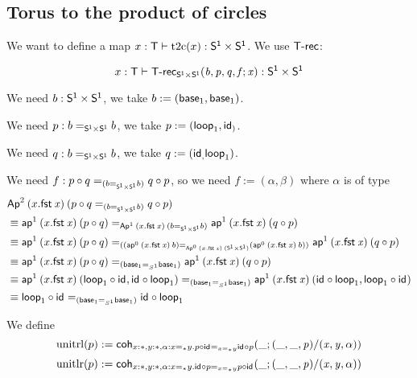 \subsection{Torus to the product of circles}

\newcommand{\ttoc}{\mathrm{t2c}}
\newcommand{\ctot}{\mathrm{c2t}}
\newcommand{\PP}{\dsd{S^1\times S^1}}
\newcommand{\unitlr}{\mathrm{unitlr}}
\newcommand{\unitrl}{\mathrm{unitrl}}

We want to define a map $x:\dsd{T}\vdash\ttoc(x):\PP$. We use
$\mathsf{T\text{-}rec}$:

\[\ofglob{x:\dsd{T}}{\dsd{T\text{-}rec}_{\PP}(b,p,q,f;x)}{\PP}\]

We need $b:\PP$, we take $b:=(\mathsf{base}_{1},\mathsf{base}_{1})$.

We need $p:\homj{\PP}{b}{b}$, we take $p:=(\mathsf{loop}_{1},\mathsf{id}_{)}$.

We need $q:\homj{\PP}{b}{b}$, we take $q:=(\mathsf{id}_{,}\mathsf{loop}_{1})$.

We need $f:\homj{(\homj{\PP}{b}{b})}{p\circ q}{q\circ p}$, so we need
$f:=(\alpha, \beta)$ where $\alpha$ is of type
\begin{align*}
  &\Apn{2}{(x.\fst x)}{(\homj{(\homj{\PP}{b}{b})}{p\circ q}{q\circ p})}\\
  &\equiv \homj{\Apn{1}{(x.\fst x)}(\homj{\PP}{b}{b})}
  {\apn{1}{(x.\fst x)}{(p\circ q)}}{\apn{1}{(x.\fst x)}{(q\circ p)}} \\
  &\equiv \homj{(\homj{\Apn{0}{(x.\fst x)}(\PP)}{(\apn{0}{(x.\fst x)}b)}
    {(\apn{0}{(x.\fst x)}b)})}
  {\apn{1}{(x.\fst x)}{(p\circ q)}}{\apn{1}{(x.\fst x)}{(q\circ p)}} \\
  &\equiv \homj{(\homj{S^1}{\base{1}}{\base{1}})}
  {\apn{1}{(x.\fst x)}{(p\circ q)}}{\apn{1}{(x.\fst x)}{(q\circ p)}} \\
  &\equiv \homj{(\homj{S^1}{\base{1}}{\base{1}})}
  {\apn{1}{(x.\fst x)}{(\lp{1}\circ\id{},\id{}\circ\lp{1})}}
  {\apn{1}{(x.\fst x)}{(\id{}\circ\lp{1}, \lp{1}\circ\id{})}} \\
  &\equiv \homj{(\homj{S^1}{\base{1}}{\base{1}})}
  {\lp{1}\circ\id{}}
  {\id{} \circ\lp{1}} \\
\end{align*}

We define
\[\unitrl(p):=\coh{x:\diagbase,y:\diagbase,\alpha:\homj{\diagbase}xy.
  \homj{\homj{\diagbase}xy}{p\circ\id{}}{\id{}\circ p}}{\_}
{(\_,\_,p)/(x,y,\alpha)}\]
\[\unitlr(p):=\coh{x:\diagbase,y:\diagbase,\alpha:\homj{\diagbase}xy.
  \homj{\homj{\diagbase}xy}{\id{}\circ p}{p\circ\id{}}}{\_}
{(\_,\_,p)/(x,y,\alpha)}\]

